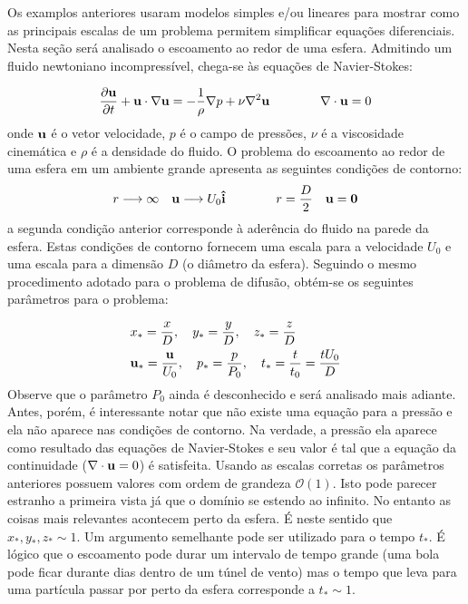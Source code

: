 Os examplos anteriores usaram modelos simples e/ou lineares para mostrar como as principais escalas de um problema permitem simplificar equações diferenciais. Nesta seção será analisado o escoamento ao redor de uma esfera. Admitindo um fluido newtoniano incompressível, chega-se às equações de Navier-Stokes:

\begin{equation}
\frac{\partial \mathbf{u}}{\partial t} +  \mathbf{u}\cdot\nabla \mathbf{u} = -\frac{1}{\rho}\nabla p + \nu\nabla^2 \mathbf{u} \qquad\qquad \nabla\cdot \mathbf{u} = 0
\label{eq:ns}
\end{equation}
onde $ \mathbf{u}$ é o vetor velocidade, $p$ é o campo de pressões, $\nu$ é a viscosidade cinemática e $\rho$ é a densidade do fluido. O problema do escoamento ao redor de uma esfera em um ambiente grande apresenta as seguintes condições de contorno:
\[
 r\longrightarrow\infty \quad  \mathbf{u}\longrightarrow U_0 \mathbf{\hat{i}} \qquad\qquad r=\frac{D}{2}\quad  \mathbf{u} =  \mathbf{0}
\]
a segunda condição anterior corresponde à aderência do fluido na parede da esfera. Estas condições de contorno fornecem uma escala para a velocidade $U_0$ e uma escala para a dimensão $D$ (o diâmetro da esfera). Seguindo o mesmo procedimento adotado para o problema de difusão, obtém-se os seguintes parâmetros para o problema:

\[
\begin{aligned}
&x_* = \frac{x}{D}, \quad y_* = \frac{y}{D}, \quad z_* = \frac{z}{D}\\
& \mathbf{u}_* = \frac{ \mathbf{u}}{U_0}, \quad p_* = \frac{p}{P_0}, \quad t_* = \frac{t}{t_0} = \frac{tU_0}{D} \\
\end{aligned}
\]
Observe que o parâmetro $P_0$ ainda é desconhecido e será analisado mais adiante. Antes, porém, é interessante notar que não existe uma equação para a pressão e ela não aparece nas condições de contorno. Na verdade, a pressão ela aparece como resultado das equações de Navier-Stokes e seu valor é tal que a equação da continuidade ($\nabla\cdot \mathbf{u}=0$) é satisfeita. Usando as escalas corretas os parâmetros anteriores possuem valores com ordem de grandeza $\mathcal{O}(1)$. Isto pode parecer estranho a primeira vista já que o domínio se estendo ao infinito. No entanto as coisas mais relevantes acontecem perto da esfera. É neste sentido que $x_*, y_*, z_* \sim 1$. Um argumento semelhante pode ser utilizado para o tempo $t_*$. É lógico que o escoamento pode durar um intervalo de tempo grande (uma bola pode ficar durante dias dentro de um túnel de vento) mas o tempo que leva para uma partícula passar por perto da esfera corresponde a  $t_*\sim 1$. 

